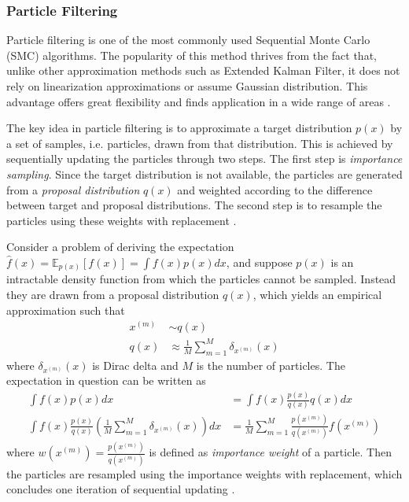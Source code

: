 \subsubsection{Particle Filtering}
Particle filtering is one of the most commonly used Sequential Monte Carlo (SMC) algorithms. The popularity of this method thrives from the fact that, unlike other approximation methods such as Extended Kalman Filter, it does not rely on linearization approximations or assume Gaussian distribution. This advantage offers great flexibility and finds application in a wide range of areas \cite{Doucet2009}. \par
The key idea in particle filtering is to approximate a target distribution $ p(x) $ by a set of samples, i.e. particles, drawn from that distribution. This is achieved by sequentially updating the particles through two steps. The first step is \textit{importance sampling}. Since the target distribution is not available, the particles are generated from a \textit{proposal distribution} $ q(x) $ and weighted according to the difference between target and proposal distributions. The second step is to resample the particles using these weights with replacement \cite{Godsill2019}. \par
Consider a problem of deriving the expectation $ \hat{f}(x) = \mathbb{E}_{p(x)} \left[ f(x)\right] = \int f(x) p(x)dx $, and suppose $ p(x) $ is an intractable density function from which the particles cannot be sampled. Instead they are drawn from a proposal distribution $ q(x) $, which yields an empirical approximation such that
\begin{align*}
x^{(m)} & \sim q(x) \\
q(x) & \approx \frac{1}{M} \sum_{m=1}^{M} \delta_{x^{(m)}}(x)
\end{align*}
where $ \delta_{x^{(m)}}(x) $ is Dirac delta and $ M $ is the number of particles. The expectation in question can be written as
\begin{align*}
\int f(x) p(x)dx & = \int f(x) \frac{p(x)}{q(x)} q(x)dx\\
\int f(x) \frac{p(x)}{q(x)} \left( \frac{1}{M} \sum_{m=1}^{M} \delta_{x^{(m)}}(x)\right) dx & = \frac{1}{M} \sum_{m=1}^{M}\frac{p(x^{(m)})}{q(x^{(m)})} f(x^{(m)})
\end{align*}
where $ w(x^{(m)}) = \frac{p(x^{(m)})}{q(x^{(m)})} $ is defined as \textit{importance weight} of a particle. Then the particles are resampled using the importance weights with replacement, which concludes one iteration of sequential updating \cite{Godsill2019}.

